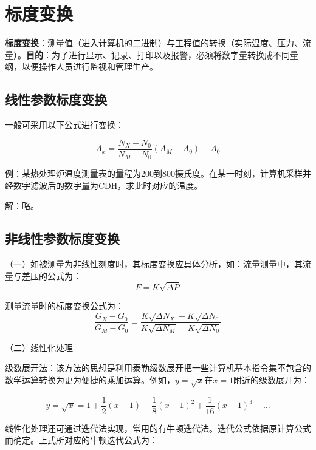 \section{标度变换}

\textbf{标度变换}：测量值（进入计算机的二进制）与工程值的转换（实际温度、压力、流量）。\textbf{目的}：为了进行显示、记录、打印以及报警，必须将数字量转换成不同量纲，以便操作人员进行监视和管理生产。






\subsection{线性参数标度变换}

一般可采用以下公式进行变换：

\begin{equation}
A_x=\frac{N_{X}-N_0}{N_{M}-N_0}(A_M-A_0)+A_0
\end{equation}

例：某热处理炉温度测量表的量程为200到800摄氏度。在某一时刻，计算机采样并经数字滤波后的数字量为CDH，求此时对应的温度。

解：略。

\subsection{非线性参数标度变换}

（一）如被测量为非线性刻度时，其标度变换应具体分析，如：流量测量中，其流量与差压的公式为：
\begin{equation}
  F=K\sqrt{\Delta P}
\end{equation}

      测量流量时的标度变换公式为：
\begin{equation}
\frac{G_X-G_0}{G_M-G_0}=\frac{K\sqrt{\Delta N_X}-K\sqrt{\Delta N_0}}{K\sqrt{\Delta N_M}-K\sqrt{\Delta N_0}}
\end{equation}

（二）线性化处理

级数展开法：该方法的思想是利用泰勒级数展开把一些计算机基本指令集不包含的数学运算转换为更为便捷的乘加运算。例如，$y=\sqrt{x}$在$x=1$附近的级数展开为：

\begin{equation}
y=\sqrt{x}=1+\frac{1}{2}(x-1)-\frac{1}{8}(x-1)^2+\frac{1}{16}(x-1)^3+\ldots
\end{equation}

线性化处理还可通过迭代法实现，常用的有牛顿迭代法。迭代公式依据原计算公式而确定。上式所对应的牛顿迭代公式为：

